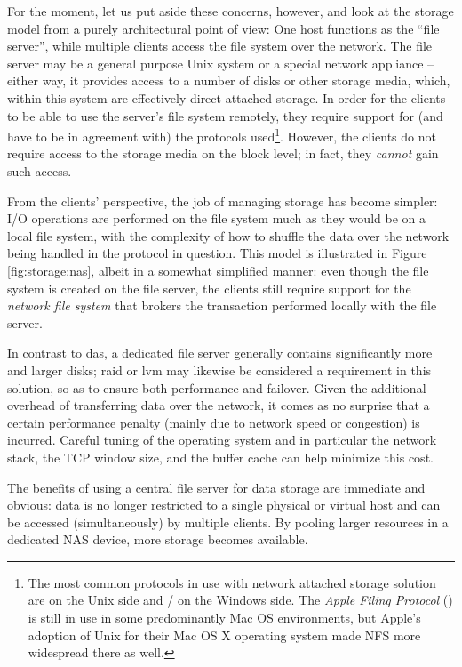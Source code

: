 For the moment, let us put aside these concerns,
however, and look at the storage model from a purely
architectural point of view:  One host functions as
the ``file server'', while multiple clients access the
file system over the network.  The file server may be
a general purpose Unix system or a special network
appliance -- either way, it provides access to a
number of disks or other storage media, which, within
this system are effectively direct attached storage.
In order for the clients to be able to use the
server's file system remotely, they require support
for (and have to be in agreement with) the protocols
used\footnote{The most common protocols in use with
network attached storage solution are
 on the Unix side and
/
on the Windows side.  The {\em Apple Filing Protocol}
() is still in use in
some predominantly Mac OS environments, but Apple's
adoption of Unix for their Mac OS X operating system
made NFS more widespread there as well.}. However, the
clients do not require access to the storage media on
the block level; in fact, they {\em cannot} gain such
access.

From the clients' perspective, the job of managing
storage has become simpler:  I/O operations are
performed on the file system much as they would be on
a local file system, with the complexity of how to
shuffle the data over the network being handled in the
protocol in question.  This model is illustrated in
Figure \ref{fig:storage:nas}, albeit in a somewhat
simplified manner:  even though the file system is
created on the file server, the clients still require
support for the {\em network file system} that brokers the transaction
performed locally with the file server.

In contrast to \gls{das}, a dedicated file server
generally contains significantly more and larger
disks; \gls{raid} or \gls{lvm} may likewise
be considered a requirement in this solution, so as to
ensure both performance and failover.  Given the
additional overhead of transferring data over the
network, it comes as no surprise that a certain
performance penalty (mainly due to network speed or
congestion) is incurred.  Careful tuning of the
operating system and in particular the network stack,
the TCP window size, and the
buffer cache can help minimize this cost.

The benefits of using a central file server for data
storage are immediate and obvious: data is no longer
restricted to a single physical or virtual host and
can be accessed (simultaneously) by multiple clients.
By pooling larger resources in a dedicated NAS device,
more storage becomes available.


